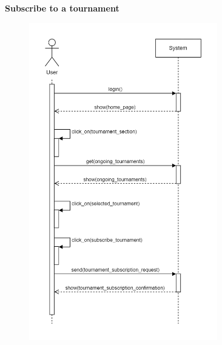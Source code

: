 \documentclass[../RASD.tex]{subfiles}
\begin{document}
    \textbf{Subscribe to a tournament}
    \begin{figure}[H]
        \centering
        \includegraphics[width=0.73\textwidth]{../assets/section_3/SubscribeToATournament.png}
    \end{figure}
    \newpage
\end{document}
